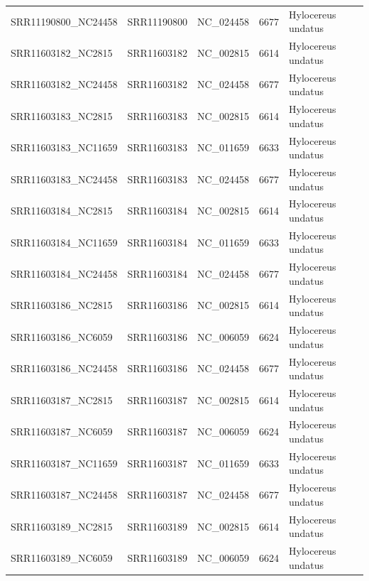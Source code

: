\documentclass[11pt]{article}
\begin{document}
\begin{supptable}[ht]
{\begin{tabular}{lllll}
SRR11190800\_NC24458 & SRR11190800  & NC\_024458              & 6677            & Hylocereus undatus    \\
SRR11603182\_NC2815  & SRR11603182  & NC\_002815              & 6614            & Hylocereus undatus    \\
SRR11603182\_NC24458 & SRR11603182  & NC\_024458              & 6677            & Hylocereus undatus    \\
SRR11603183\_NC2815  & SRR11603183  & NC\_002815              & 6614            & Hylocereus undatus    \\
SRR11603183\_NC11659 & SRR11603183  & NC\_011659              & 6633            & Hylocereus undatus    \\
SRR11603183\_NC24458 & SRR11603183  & NC\_024458              & 6677            & Hylocereus undatus    \\
SRR11603184\_NC2815  & SRR11603184  & NC\_002815              & 6614            & Hylocereus undatus    \\
SRR11603184\_NC11659 & SRR11603184  & NC\_011659              & 6633            & Hylocereus undatus    \\
SRR11603184\_NC24458 & SRR11603184  & NC\_024458              & 6677            & Hylocereus undatus    \\
SRR11603186\_NC2815  & SRR11603186  & NC\_002815              & 6614            & Hylocereus undatus    \\
SRR11603186\_NC6059  & SRR11603186  & NC\_006059              & 6624            & Hylocereus undatus    \\
SRR11603186\_NC24458 & SRR11603186  & NC\_024458              & 6677            & Hylocereus undatus    \\
SRR11603187\_NC2815  & SRR11603187  & NC\_002815              & 6614            & Hylocereus undatus    \\
SRR11603187\_NC6059  & SRR11603187  & NC\_006059              & 6624            & Hylocereus undatus    \\
SRR11603187\_NC11659 & SRR11603187  & NC\_011659              & 6633            & Hylocereus undatus    \\
SRR11603187\_NC24458 & SRR11603187  & NC\_024458              & 6677            & Hylocereus undatus    \\
SRR11603189\_NC2815  & SRR11603189  & NC\_002815              & 6614            & Hylocereus undatus    \\
SRR11603189\_NC6059  & SRR11603189  & NC\_006059              & 6624            & Hylocereus undatus    \\

\end{tabular}}
\end{supptable}
\end{document}
